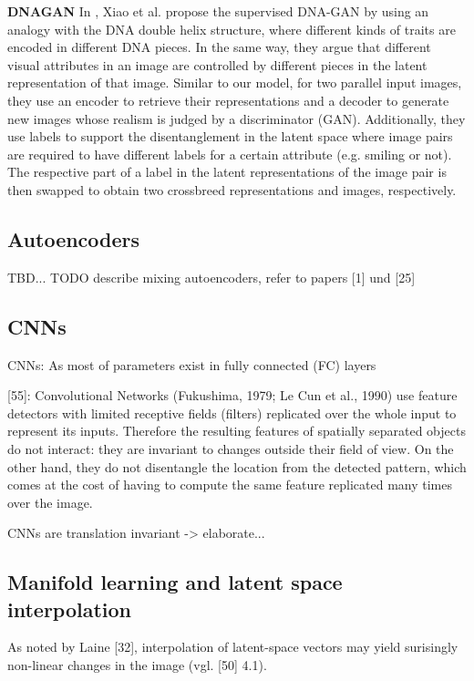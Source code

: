 \documentclass[12pt,a4paper]{article}
\begin{document}
\par \textbf{DNAGAN} In \cite{DnaGan}, Xiao et al. propose the supervised DNA-GAN by using an analogy with the DNA double helix structure, where different kinds of traits are encoded in different DNA pieces. In the same way, they argue that different visual attributes in an image are controlled by different pieces in the latent representation of that image. Similar to our model, for two parallel input images, they use an encoder to retrieve their representations and a decoder to generate new images whose realism is judged by a discriminator (GAN). Additionally, they use labels to support the disentanglement in the latent space where image pairs are required to have different labels for a certain attribute (e.g. smiling or not). The respective part of a label in the latent representations of the image pair is then swapped to obtain two crossbreed representations and images, respectively.


\subsection{Autoencoders}
TBD...
TODO describe mixing autoencoders, refer to papers [1] und [25]

\subsection{CNNs}
\par CNNs: As most of parameters exist in fully connected (FC) layers

[55]: Convolutional Networks (Fukushima, 1979; Le Cun et al., 1990) use feature detectors with limited receptive fields (filters) replicated over the whole input to represent its inputs. Therefore the resulting features of spatially separated objects do not interact: they are invariant to changes outside their field of view. On the other hand, they do not disentangle the location from the detected pattern, which comes at the cost of having to compute the same feature replicated many times over the image.

\par CNNs are translation invariant -> elaborate...



\subsection{Manifold learning and latent space interpolation}
As noted by Laine [32], interpolation of latent-space vectors may yield surisingly non-linear changes in the image (vgl. [50] 4.1).
\end{document}
